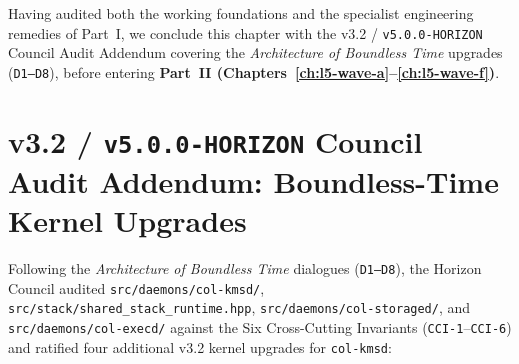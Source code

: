 Having audited both the working foundations and the specialist engineering remedies of Part~I, we
conclude this chapter with the v3.2 / \texttt{v5.0.0-HORIZON} Council Audit Addendum covering the
\textit{Architecture of Boundless Time} upgrades (\texttt{D1--D8}), before entering
\textbf{Part~II (Chapters~\ref{ch:l5-wave-a}--\ref{ch:l5-wave-f})}.

\section{v3.2 / \texttt{v5.0.0-HORIZON} Council Audit Addendum: Boundless-Time Kernel Upgrades}
\label{sec:ch8-v32-horizon-addendum}

Following the \textit{Architecture of Boundless Time} dialogues (\texttt{D1--D8}), the Horizon
Council audited \texttt{src/daemons/col-kmsd/}, \texttt{src/stack/shared\_stack\_runtime.hpp},
\texttt{src/daemons/col-storaged/}, and \texttt{src/daemons/col-execd/} against the Six
Cross-Cutting Invariants (\texttt{CCI-1}--\texttt{CCI-6}) and ratified four additional v3.2
kernel upgrades for \texttt{col-kmsd}:

